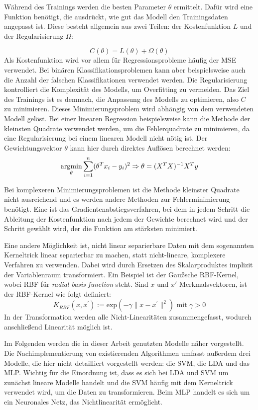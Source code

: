 		Während des Trainings werden die besten Parameter $\theta$ ermittelt. Dafür wird eine Funktion benötigt, die ausdrückt, wie gut das Modell den Trainingsdaten angepasst ist. Diese besteht allgemein aus zwei Teilen: der Kostenfunktion $L$ und der Regularisierung $\Omega$:
		
		\[
			C(\theta)= L(\theta) + \Omega(\theta)
		\]
		Als Kostenfunktion wird vor allem für Regressionsprobleme häufig der \ac{MSE} verwendet. Bei binären Klassifikationsproblemen kann aber beispielsweise auch die Anzahl der falschen Klassifikationen verwendet werden. Die Regularisierung kontrolliert die Komplexität des Modells, um Overfitting zu vermeiden. Das Ziel des Trainings ist es demnach, die Anpassung des Modells zu optimieren, also $C$ zu minimieren. Dieses Minimierungsproblem wird abhängig von dem verwendeten Modell gelöst. Bei einer linearen Regression beispielsweise kann die Methode der kleinsten Quadrate verwendet werden, um die Fehlerquadrate zu minimieren, da eine Regularisierung bei einem linearen Modell nicht nötig ist. Der Gewichtungsvektor $\theta$ kann hier durch direktes Auflösen berechnet werden:
		\[
			\operatorname*{argmin}_{\theta} \sum_{i=1}^{n} (\theta^T x_i - y_i)^2
			\Rightarrow \theta = (X^T X)^{-1} X^Ty
		\]
		
		Bei komplexeren Minimierungsproblemen ist die Methode kleinster Quadrate nicht ausreichend und es werden andere Methoden zur Fehlerminimierung benötigt. Eine ist das Gradientenabstiegsverfahren, bei dem in jedem Schritt die Ableitung der Kostenfunktion nach jedem der Gewichte berechnet wird und der Schritt gewählt wird, der die Funktion am stärksten minimiert.
		
		Eine andere Möglichkeit ist, nicht linear separierbare Daten mit dem sogenannten Kerneltrick linear separierbar zu machen, statt nicht-lineare, komplexere Verfahren zu verwenden. Dabei wird durch Ersetzen des Skalarproduktes implizit der Variablenraum transformiert. Ein Beispiel ist der Gaußsche RBF-Kernel, wobei RBF für \textit{radial basis function} steht. Sind $x$ und $x'$ Merkmalsvektoren, ist der RBF-Kernel wie folgt definiert:
		\[
			K_{RBF} (x, x^\prime) := \text{exp}(-\gamma \|x - x^\prime\|^2) \text{ mit } \gamma > 0
		\]
		In der Transformation werden alle Nicht-Linearitäten zusammengefasst, wodurch anschließend Linearität möglich ist. %
		
		Im Folgenden werden die in dieser Arbeit genutzten Modelle näher vorgestellt. Die Nachimplementierung von existierenden Algorithmen umfasst außerdem drei Modelle, die hier nicht detailliert vorgestellt werden: die \ac{SVM}, die \ac{LDA} und das \ac{MLP}. Wichtig für die Einordnung ist, dass es sich bei \ac{LDA} und \ac{SVM} um zunächst lineare Modelle handelt und die \ac{SVM} häufig mit dem Kerneltrick verwendet wird, um die Daten zu transformieren. Beim \ac{MLP} handelt es sich um ein Neuronales Netz, das Nichtlinearität ermöglicht.

